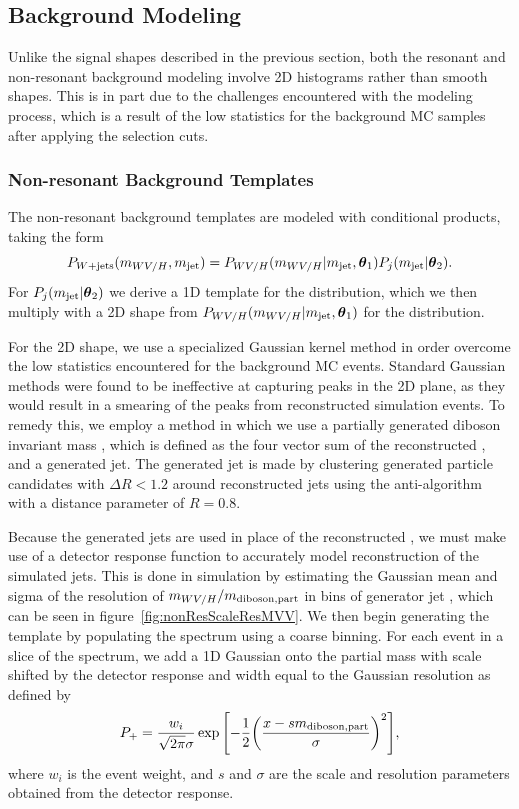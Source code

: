 \subsection{Background Modeling}
\label{sec:bkg}

Unlike the signal shapes described in the previous section, both the resonant and non-resonant background modeling involve 2D histograms rather than smooth shapes.
This is in part due to the challenges encountered with the modeling process, which is a result of the low statistics for the background MC samples after applying the selection cuts.

\subsubsection{Non-resonant Background Templates}

The non-resonant background templates are modeled with conditional products, taking the form
\begin{equation}
  P_{W+\text{jets}}(m_{WV/H},m_\mathrm{jet})=P_{WV/H}(m_{WV/H}|m_\mathrm{jet},\vb*{\theta}_1)P_j(m_\mathrm{jet}|\vb*{\theta}_2).
\end{equation}
For $P_j(m_\mathrm{jet}|\vb*{\theta}_2)$ we derive a 1D template for the \MJ distribution, which we then multiply with a 2D shape from $P_{WV/H}(m_{WV/H}|m_\mathrm{jet},\vb*{\theta}_1)$ for the \MVV distribution.

For the 2D \MVV shape, we use a specialized Gaussian kernel method in order overcome the low statistics encountered for the background MC events.
Standard Gaussian methods were found to be ineffective at capturing peaks in the 2D plane, as they would result in a smearing of the peaks from reconstructed simulation events.
To remedy this, we employ a method in which we use a partially generated diboson invariant mass \MVVpart, which is defined as the four vector sum of the reconstructed \Wlep, and a generated jet.
The generated jet is made by clustering generated particle candidates with $\Delta R<1.2$ around reconstructed jets using the anti-\kt algorithm with a distance parameter of $R=0.8$.

Because the generated jets are used in place of the reconstructed \Vhad, we must make use of a detector response function to accurately model reconstruction of the simulated jets.
This is done in simulation by estimating the Gaussian mean and sigma of the resolution of $m_{WV/H}/m_\mathrm{diboson,part}$ in bins of generator jet \pt, which can be seen in figure~\ref{fig:nonResScaleResMVV}.
We then begin generating the template by populating the \MJ spectrum using a coarse binning.
For each event in a slice of the \MJ spectrum, we add a 1D Gaussian onto the partial mass with scale shifted by the detector response and width equal to the Gaussian resolution as defined by
\begin{equation}\label{eq:Pplus}
  P_+=\frac{w_i}{\sqrt{2\pi}\sigma}\exp\bqty{-\frac{1}{2}\pqty{\frac{x-s\MVVpart}{\sigma}}^2},
\end{equation}
where $w_i$ is the event weight, and $s$ and $\sigma$ are the scale and resolution parameters obtained from the detector response.

